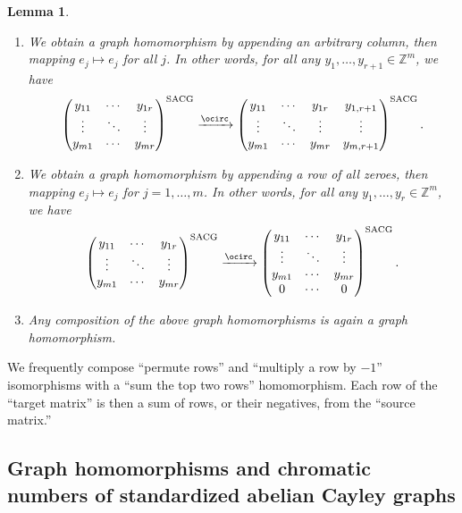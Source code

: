 \documentclass{article}
\newtheorem{Lem}[Thm]{Lemma}
\theoremstyle{definition}
\theoremstyle{remark}
\begin{document}
\begin{Lem}
\begin{enumerate}
\item\label{lemma-homomorphisms-append-columns} We obtain a graph homomorphism by appending an arbitrary column, then mapping $e_j\mapsto e_j$ for all $j$.  In other words, for all any  $y_1,\dots,y_{r+1}\in \mathbb{Z}^m$, we have \[
\begin{pmatrix}y_{11} & \cdots & y_{1r}\\
\vdots & \ddots & \vdots \\
y_{m1} & \cdots & y_{mr}\end{pmatrix}^{\text{SACG}}
    \xrightarrow{\ocirc}
    \begin{pmatrix}y_{11} & \cdots & y_{1r} & y_{1,r+1}\\
\vdots & \ddots & \vdots & \vdots \\
y_{m1} & \cdots & y_{mr} & y_{m,r+1}\end{pmatrix}^{\text{SACG}}.
\]

\item\label{lemma-homomorphisms-append-zero-row} We obtain a graph homomorphism by appending a row of all zeroes, then mapping $e_j\mapsto e_j$ for $j=1,\dots,m$.  In other words, for all any  $y_1,\dots,y_{r}\in \mathbb{Z}^m$, we have \[
\begin{pmatrix}y_{11} & \cdots & y_{1r}\\
\vdots & \ddots & \vdots \\
y_{m1} & \cdots & y_{mr}\end{pmatrix}^{\text{SACG}}
    \xrightarrow{\ocirc}
    \begin{pmatrix}y_{11} & \cdots & y_{1r}\\
\vdots & \ddots & \vdots \\
y_{m1} & \cdots & y_{mr}\\
0 & \cdots & 0\end{pmatrix}^{\text{SACG}}.
\]

\item\label{lemma-homomorphisms-composition} Any composition of the above graph homomorphisms is again a graph homomorphism.
    
\end{enumerate}

\end{Lem}

We frequently compose ``permute rows'' and ``multiply a row by $-1$'' isomorphisms with a ``sum the top two rows'' homomorphism.  Each row of the ``target matrix'' is then a sum of rows, or their negatives, from the ``source matrix.''

\subsection{Graph homomorphisms and chromatic numbers of standardized abelian Cayley graphs}\label{subsetction-homomorphisms}
\end{document}
